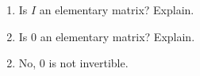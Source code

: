 \begin{multicols}{2}
\begin{ex}
\begin{enumerate}[label={\alph*.}]
\item Is $I$ an elementary matrix? Explain.

\item Is $0$ an elementary matrix? Explain.

\end{enumerate}
\begin{sol}
\begin{enumerate}[label={\alph*.}]
\setcounter{enumi}{1}
\item  No, $0$ is not invertible.

\end{enumerate}
\end{sol}
\end{ex}


\end{multicols}
